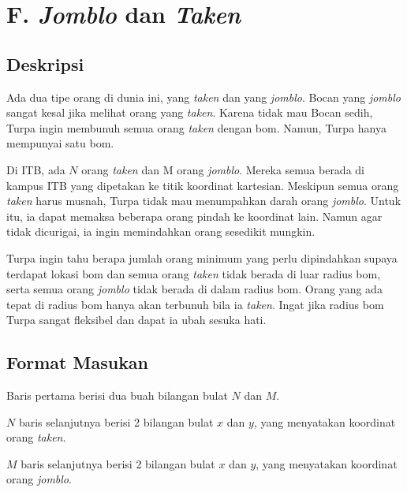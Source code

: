 \documentclass{article}
\begin{document}
\section*{\hfil F. \textit{Jomblo} dan \textit{Taken}\hfil}


\subsection*{Deskripsi}

\par\noindent Ada dua tipe orang di dunia ini, yang \textit{taken} dan yang \textit{jomblo}. Bocan yang \textit{jomblo} sangat kesal jika melihat orang yang \textit{taken}. Karena tidak mau Bocan sedih, Turpa ingin membunuh semua orang \textit{taken} dengan bom. Namun, Turpa hanya mempunyai satu bom.

\par\noindent Di ITB, ada $N$ orang \textit{taken} dan M orang \textit{jomblo}. Mereka semua berada di kampus ITB yang dipetakan ke titik koordinat kartesian. Meskipun semua orang \textit{taken} harus musnah, Turpa tidak mau menumpahkan darah orang \textit{jomblo}. Untuk itu, ia dapat memaksa beberapa orang pindah ke koordinat lain. Namun agar tidak dicurigai, ia ingin memindahkan orang sesedikit mungkin.

\par\noindent Turpa ingin tahu berapa jumlah orang minimum yang perlu dipindahkan supaya terdapat lokasi bom dan semua orang \textit{taken} tidak berada di luar radius bom, serta semua orang \textit{jomblo} tidak berada di dalam radius bom. Orang yang ada tepat di radius bom hanya akan terbunuh bila ia \textit{taken}. Ingat jika radius bom Turpa sangat fleksibel dan dapat ia ubah sesuka hati.

\subsection*{Format Masukan}

\par\noindent Baris pertama berisi dua buah bilangan bulat $N$ dan $M$.
\par\noindent $N$ baris selanjutnya berisi 2 bilangan bulat $x$ dan $y$, yang menyatakan koordinat orang \textit{taken}.
\par\noindent $M$ baris selanjutnya berisi 2 bilangan bulat $x$ dan $y$, yang menyatakan koordinat orang \textit{jomblo}.
\end{document}
